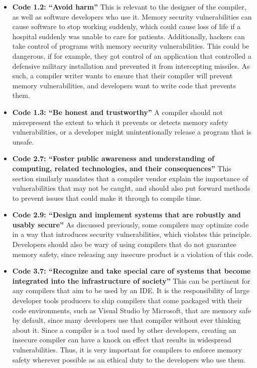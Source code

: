 \documentclass[sigconf, anonymous]{acmart}
\begin{document}
\begin{itemize}

\item \textbf{Code 1.2: “Avoid harm”} This is relevant to the designer of the compiler, as well as software developers who use it. Memory security vulnerabilities can cause software to stop working suddenly, which could cause loss of life if a hospital suddenly was unable to care for patients. Additionally, hackers can take control of programs with memory security vulnerabilities. This could be dangerous, if for example, they got control of an application that controlled a defensive military installation and prevented it from intercepting missiles. As such, a compiler writer wants to ensure that their compiler will prevent memory vulnerabilities, and developers want to write code that prevents them. 

\item \textbf{Code 1.3: “Be honest and trustworthy”} A compiler should not misrepresent the extent to which it prevents or detects memory safety vulnerabilities, or a developer might unintentionally release a program that is unsafe. 

\item \textbf{Code 2.7: “Foster public awareness and understanding of computing, related technologies, and their consequences”} This section similarly mandates that a compiler vendor explain the importance of vulnerabilities that may not be caught, and should also put forward methods to prevent issues that could make it through to compile time. 

\item \textbf{Code 2.9: “Design and implement systems that are robustly and usably secure”} As discussed previously, some compilers may optimize code in a way that introduces security vulnerabilities, which violates this principle. Developers should also be wary of using compilers that do not guarantee memory safety, since releasing any insecure product is a violation of this code. 

\item \textbf{Code 3.7: “Recognize and take special care of systems that become integrated into the infrastructure of society”} This can be pertinent for any compilers that aim to be used by an IDE. It is the responsibility of large developer tools producers to ship compilers that come packaged with their code environments, such as Visual Studio by Microsoft, that are memory safe by default, since many developers use that compiler without ever thinking about it. Since a compiler is a tool used by other developers, creating an insecure compiler can have a knock on effect that results in widespread vulnerabilities. Thus, it is very important for compilers to enforce memory safety wherever possible as an ethical duty to the developers who use them.

\end{itemize}
\end{document}
